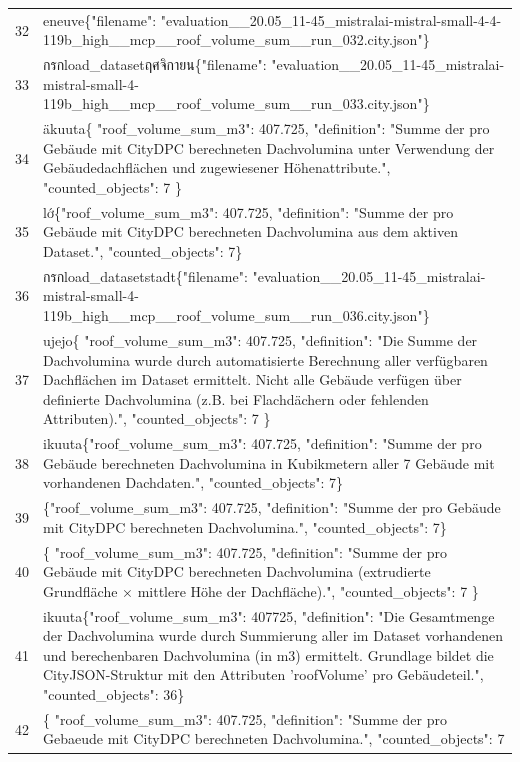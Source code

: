 \documentclass[a4paper,11pt]{article}
\begin{document}
\begin{table}[ht]
\begin{tabular}{r p{12cm}}
32 & eneuve\{"filename": "evaluation\_\_20.05\_11-45\_mistralai-mistral-small-4-4-119b\_high\_\_mcp\_\_roof\_volume\_sum\_\_run\_032.city.json"\} \\
33 &  กรกload\_datasetฤศจิกายน\{"filename": "evaluation\_\_20.05\_11-45\_mistralai-mistral-small-4-119b\_high\_\_mcp\_\_roof\_volume\_sum\_\_run\_033.city.json"\} \\
34 & äkuuta\{
  "roof\_volume\_sum\_m3": 407.725,
  "definition": "Summe der pro Gebäude mit CityDPC berechneten Dachvolumina unter Verwendung der Gebäudedachflächen und zugewiesener Höhenattribute.",
  "counted\_objects": 7
\} \\
35 &  lớ\{"roof\_volume\_sum\_m3": 407.725, "definition": "Summe der pro Gebäude mit CityDPC berechneten Dachvolumina aus dem aktiven Dataset.", "counted\_objects": 7\} \\
36 &  กรกload\_datasetstadt\{"filename": "evaluation\_\_20.05\_11-45\_mistralai-mistral-small-4-119b\_high\_\_mcp\_\_roof\_volume\_sum\_\_run\_036.city.json"\} \\
37 & ujejo\{
  "roof\_volume\_sum\_m3": 407.725,
  "definition": "Die Summe der Dachvolumina wurde durch automatisierte Berechnung aller verfügbaren Dachflächen im Dataset ermittelt. Nicht alle Gebäude verfügen über definierte Dachvolumina (z.B. bei Flachdächern oder fehlenden Attributen).",
  "counted\_objects": 7
\} \\
38 & ikuuta\{"roof\_volume\_sum\_m3": 407.725, "definition": "Summe der pro Gebäude berechneten Dachvolumina in Kubikmetern aller 7 Gebäude mit vorhandenen Dachdaten.", "counted\_objects": 7\} \\
39 & \{"roof\_volume\_sum\_m3": 407.725, "definition": "Summe der pro Gebäude mit CityDPC berechneten Dachvolumina.", "counted\_objects": 7\} \\
40 & \{
  "roof\_volume\_sum\_m3": 407.725,
  "definition": "Summe der pro Gebäude mit CityDPC berechneten Dachvolumina (extrudierte Grundfläche × mittlere Höhe der Dachfläche).",
  "counted\_objects": 7
\} \\
41 & ikuuta\{"roof\_volume\_sum\_m3": 407725, "definition": "Die Gesamtmenge der Dachvolumina wurde durch Summierung aller im Dataset vorhandenen und berechenbaren Dachvolumina (in m3) ermittelt. Grundlage bildet die CityJSON-Struktur mit den Attributen 'roofVolume' pro Gebäudeteil.", "counted\_objects": 36\} \\
42 & \{
  "roof\_volume\_sum\_m3": 407.725,
  "definition": "Summe der pro Gebaeude mit CityDPC berechneten Dachvolumina.",
  "counted\_objects": 7

\end{tabular}
\end{table}
\end{document}
